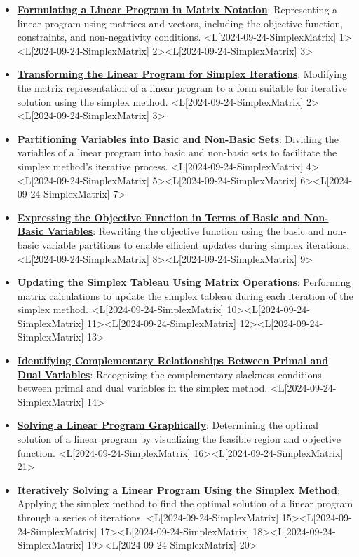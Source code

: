 \documentclass{article}%
\begin{document}
\begin{itemize}[[leftmargin=*]]%
\item \href{https://www.math.purdue.edu/~yipn/421/2024-09-24-SimplexMatrix.pdf#page=1}{\textbf{Formulating a Linear Program in Matrix Notation}}: Representing a linear program using matrices and vectors, including the objective function, constraints, and non-negativity conditions. <L[2024-09-24-SimplexMatrix] 1><L[2024-09-24-SimplexMatrix] 2><L[2024-09-24-SimplexMatrix] 3>%
\item \href{https://www.math.purdue.edu/~yipn/421/2024-09-24-SimplexMatrix.pdf#page=2}{\textbf{Transforming the Linear Program for Simplex Iterations}}: Modifying the matrix representation of a linear program to a form suitable for iterative solution using the simplex method. <L[2024-09-24-SimplexMatrix] 2><L[2024-09-24-SimplexMatrix] 3>%
\item \href{https://www.math.purdue.edu/~yipn/421/2024-09-24-SimplexMatrix.pdf#page=4}{\textbf{Partitioning Variables into Basic and Non{-}Basic Sets}}: Dividing the variables of a linear program into basic and non-basic sets to facilitate the simplex method's iterative process. <L[2024-09-24-SimplexMatrix] 4><L[2024-09-24-SimplexMatrix] 5><L[2024-09-24-SimplexMatrix] 6><L[2024-09-24-SimplexMatrix] 7>%
\item \href{https://www.math.purdue.edu/~yipn/421/2024-09-24-SimplexMatrix.pdf#page=8}{\textbf{Expressing the Objective Function in Terms of Basic and Non{-}Basic Variables}}: Rewriting the objective function using the basic and non-basic variable partitions to enable efficient updates during simplex iterations. <L[2024-09-24-SimplexMatrix] 8><L[2024-09-24-SimplexMatrix] 9>%
\item \href{https://www.math.purdue.edu/~yipn/421/2024-09-24-SimplexMatrix.pdf#page=10}{\textbf{Updating the Simplex Tableau Using Matrix Operations}}: Performing matrix calculations to update the simplex tableau during each iteration of the simplex method. <L[2024-09-24-SimplexMatrix] 10><L[2024-09-24-SimplexMatrix] 11><L[2024-09-24-SimplexMatrix] 12><L[2024-09-24-SimplexMatrix] 13>%
\item \href{https://www.math.purdue.edu/~yipn/421/2024-09-24-SimplexMatrix.pdf#page=14}{\textbf{Identifying Complementary Relationships Between Primal and Dual Variables}}: Recognizing the complementary slackness conditions between primal and dual variables in the simplex method. <L[2024-09-24-SimplexMatrix] 14>%
\item \href{https://www.math.purdue.edu/~yipn/421/2024-09-24-SimplexMatrix.pdf#page=16}{\textbf{Solving a Linear Program Graphically}}: Determining the optimal solution of a linear program by visualizing the feasible region and objective function. <L[2024-09-24-SimplexMatrix] 16><L[2024-09-24-SimplexMatrix] 21>%
\item \href{https://www.math.purdue.edu/~yipn/421/2024-09-24-SimplexMatrix.pdf#page=15}{\textbf{Iteratively Solving a Linear Program Using the Simplex Method}}: Applying the simplex method to find the optimal solution of a linear program through a series of iterations. <L[2024-09-24-SimplexMatrix] 15><L[2024-09-24-SimplexMatrix] 17><L[2024-09-24-SimplexMatrix] 18><L[2024-09-24-SimplexMatrix] 19><L[2024-09-24-SimplexMatrix] 20>%
\end{itemize}%
\end{document}
